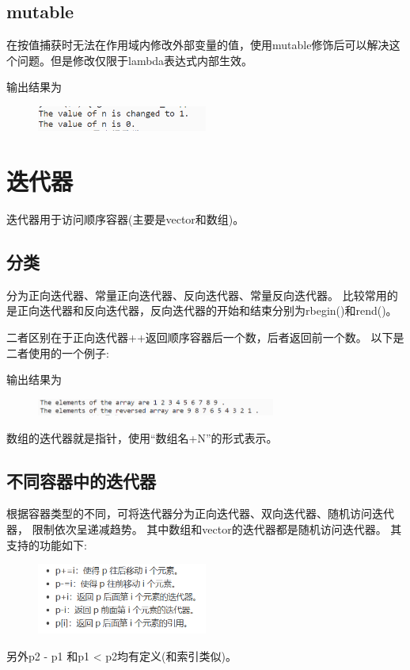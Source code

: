\documentclass{article}
\begin{document}
    \subsection{mutable}
    在按值捕获时无法在作用域内修改外部变量的值，使用mutable修饰后可以解决这个问题。但是修改仅限于lambda表达式内部生效。
    
    输出结果为
    \begin{figure}[H]
        \centering
        \includegraphics[width = 0.5\textwidth]{fig3.png}
    \end{figure}
    
    \section{迭代器}
    迭代器用于访问顺序容器(主要是vector和数组)。
    \subsection{分类}
    分为正向迭代器、常量正向迭代器、反向迭代器、常量反向迭代器。
    比较常用的是正向迭代器和反向迭代器，反向迭代器的开始和结束分别为rbegin()和rend()。

    二者区别在于正向迭代器++返回顺序容器后一个数，后者返回前一个数。
    以下是二者使用的一个例子:
    
    
    输出结果为
    \begin{figure}[H]
        \centering
        \includegraphics[width = 0.7\textwidth]{fig4.png}
    \end{figure}

    数组的迭代器就是指针，使用``数组名+N''的形式表示。

    \subsection{不同容器中的迭代器}
    根据容器类型的不同，可将迭代器分为正向迭代器、双向迭代器、随机访问迭代器，
    限制依次呈递减趋势。
    其中数组和vector的迭代器都是随机访问迭代器。
    其支持的功能如下:
    \begin{figure}[H]
        \centering
        \includegraphics[width = 0.5\textwidth]{fig5.png}
    \end{figure}
    另外p2 - p1 和p1 < p2均有定义(和索引类似)。
\end{document}
